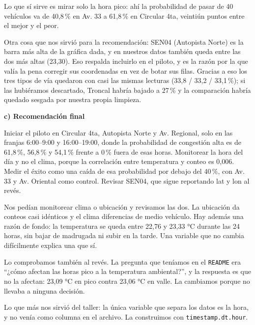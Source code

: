 \documentclass[11pt]{article}
\begin{document}
\begin{respuesta}[Respuesta 3.C]
Lo que sí sirve es mirar solo la hora pico: ahí la probabilidad de pasar de 40 vehículos va de 40,8\,\% en Av. 33 a 61,8\,\% en Circular 4ta, veintiún puntos entre el mejor y el peor.

Otra cosa que nos sirvió para la recomendación: SEN04 (Autopista Norte) es la barra más alta de la gráfica dada, y en nuestros datos también queda entre las dos más altas (23,30). Eso respalda incluirlo en el piloto, y es la razón por la que valía la pena corregir sus coordenadas en vez de botar sus filas. Gracias a eso los tres tipos de vía quedaron con casi las mismas lecturas (33,8 / 33,2 / 33,1\,\%); si las hubiéramos descartado, Troncal habría bajado a 27\,\% y la comparación habría quedado sesgada por nuestra propia limpieza.

\medskip
\noindent\textbf{c) Recomendación final}

\begin{tcolorbox}[colback=green!4,colframe=green!45!black,title=Recomendación para la Secretaría de Movilidad,fonttitle=\bfseries]
Iniciar el piloto en Circular 4ta, Autopista Norte y Av. Regional, solo en las franjas 6:00--9:00 y 16:00--19:00, donde la probabilidad de congestión alta es de 61,8\,\%, 56,8\,\% y 54,1\,\% frente a 0\,\% fuera de esas horas. Monitorear la hora del día y no el clima, porque la correlación entre temperatura y conteo es 0,006. Medir el éxito como una caída de esa probabilidad por debajo del 40\,\%, con Av. 33 y Av. Oriental como control. Revisar SEN04, que sigue reportando lat y lon al revés.
\end{tcolorbox}

\medskip
\noindent Nos pedían monitorear clima o ubicación y revisamos las dos. La ubicación da conteos casi idénticos y el clima diferencias de medio vehículo. Hay además una razón de fondo: la temperatura se queda entre 22,76 y 23,33 °C durante las 24 horas, sin bajar de madrugada ni subir en la tarde. Una variable que no cambia difícilmente explica una que sí.

Lo comprobamos también al revés. La pregunta que teníamos en el \texttt{README} era ``¿cómo afectan las horas pico a la temperatura ambiental?'', y la respuesta es que no la afectan: 23,09 °C en pico contra 23,06 °C en valle. La cambiamos porque no llevaba a ninguna decisión.

Lo que más nos sirvió del taller: la única variable que separa los datos es la hora, y no venía como columna en el archivo. La construimos con \texttt{timestamp.dt.hour}.
\end{respuesta}
\end{document}

